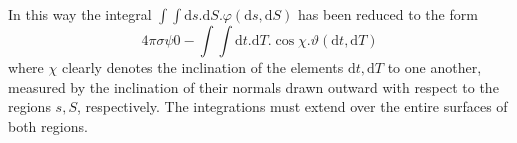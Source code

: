 In this way the integral $\int\int\mathrm{d}s.\mathrm{d}S.\varphi(\mathrm{d}s,\mathrm{d}S)$ has been reduced to the form
\[
4\pi\sigma\psi0-\int\int\mathrm{d}t.\mathrm{d}T.\cos\chi.\vartheta(\mathrm{d}t,\mathrm{d}T)
\]
where $\chi$ clearly denotes the inclination of the elements $\mathrm{d}t,\mathrm{d}T$ to one another, measured by the inclination of their normals drawn outward with respect to the regions $s,S$, respectively. The integrations must extend over the entire surfaces of both regions.

